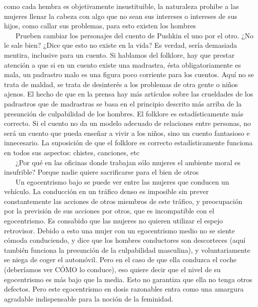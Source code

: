 como cada hembra es objetivamente insustituible, la naturaleza prohibe a
las mujeres llenar la cabeza con algo que no sean sus intereses o
intereses de sus hijos, como callar sus problemas, para esto existen los
hombres\\
\hspace*{0.333em} ~ ~ Prueben cambiar los personajes del cuento de
Pushkin el uno por el otro. ¿No le sale bien? ¿Dice que esto no existe
en la vida? Es verdad, sería demasiada mentira, inclusive para un
cuento. Si hablamos del folklore, hay que prestar atención a que si en
un cuento existe una madrastra, ésta obligatoriamente es mala, un
padrastro malo es una figura poco corriente para los cuentos. Aquí no se
trata de maldad, se trata de desinterés a los problemas de otra gente o
niños ajenos. El hecho de que en la prensa hay más artículos sobre las
crueldades de los padrastros que de madrastras se basa en el principio
descrito más arriba de la presunción de culpabilidad de los hombres. El
folklore es estadísticamente más correcto. Si el cuento no da un modelo
adecuado de relaciones entre personas, no será un cuento que pueda
enseñar a vivir a los niños, sino un cuento fantasioso e innecesario. La
suposición de que el folklore es correcto estadísticamente funciona en
todos sus aspectos: chistes, canciones, etc\\
\hspace*{0.333em} ~ ~ ¿Por qué en las oficinas donde trabajan sólo
mujeres el ambiente moral es insufrible? Porque nadie quiere
sacrificarse para el bien de otros\\
\hspace*{0.333em} ~ ~ Un egocentrismo bajo se puede ver entre las
mujeres que conducen un vehículo. La conducción en un tráfico denso es
imposible sin prever constantemente las acciones de otros miembros de
este tráfico, y preocupación por la previsión de sus acciones por otros,
que es incompatible con el egocentrismo. Es consabido que las mujeres no
quieren utilizar el espejo retrovisor. Debido a esto una mujer con un
egocentrismo medio no se siente cómoda conduciendo, y dice que los
hombres conductores son descorteces (aquí también funciona la presunción
de la culpabilidad masculina), y voluntariamente se niega de coger el
automóvil. Pero en el caso de que ella conduzca el coche (deberíamos ver
CÓMO lo conduce), eso quiere decir que el nivel de su egocentrismo es
más bajo que la media. Esto no garantiza que ella no tenga otros
defectos. Pero este egocentrismo en dosis razonables entra como una
amargura agradable indispensable para la noción de la feminidad.


